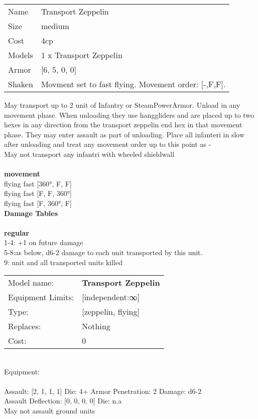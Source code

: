 \begin{tabular}{ll}
  Name & Transport Zeppelin \\
  Size & medium\\
  Cost & 4cp\\
  Models & 1 x Transport Zeppelin\\
  Armor & [6, 5, 0, 0]\\
  Shaken & Movment set to fast flying. Movement order: [-,F,F].\\
\end{tabular}

\noindent May transport up to 2 unit of Infantry or SteamPowerArmor. Unload in any movement phase. When unloading they use hanggliders and are placed up to two hexes in any direction from the transport zeppelin end hex in that movement phase. They may enter assault as part of unloading. Place all infanteri in slow after unloading and treat any movement order up to this point as -\\ 
May not transport any infantri with wheeled shieldwall\\ 


\ \\ {\bf movement } \\
flying fast [360°, F, F] \\
flying fast [F, F, 360°] \\
flying fast [F, 360°, F] \\


{\bf Damage Tables} \\
\ \\ {\bf regular } \\
1-4: +1 on future damage \\
5-8:as below, d6-2 damage to each unit transported by this unit. \\
9: unit and all transported units killed \\


\noindent
\begin{tabular}{ll}
Model name: &{\bf Transport Zeppelin } \\
Equipment Limits: &[independent:∞] \\
Type: &[zeppelin, flying] \\
Replaces: &Nothing \\
Cost: & 0\\
\end{tabular}
\ \\
Equipment:  \\
\ \\
Assault: [2, 1, 1, 1] Die: 4+ Armor Penetration: 2 Damage: d6-2 \\
Assault Deflection: [0, 0, 0, 0] Die: n.a\\
\indent May not assault ground units\\ 
 
